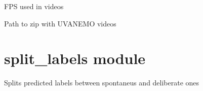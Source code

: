 \documentclass[letterpaper,10pt,english]{sphinxmanual}
\begin{document}
\begin{fulllineitems}
\begin{fulllineitems}
\begin{quote}
\begin{description}
\end{description}\end{quote}

\end{fulllineitems}


\begin{fulllineitems}
\label{\detokenize{net:net.UVANEMO.videos_frequency}}
\pysigstartsignatures
{}
\pysigstopsignatures
\sphinxAtStartPar
FPS used in videos

\end{fulllineitems}


\begin{fulllineitems}
\label{\detokenize{net:net.UVANEMO.videos_path}}
\pysigstartsignatures
{}
\pysigstopsignatures
\sphinxAtStartPar
Path to zip with UVA\sphinxhyphen{}NEMO videos

\end{fulllineitems}


\end{fulllineitems}


\sphinxstepscope


\section{split\_labels module}
\label{\detokenize{split_labels:module-split_labels}}\label{\detokenize{split_labels:split-labels-module}}\label{\detokenize{split_labels::doc}}

\begin{fulllineitems}
\label{\detokenize{split_labels:split_labels.main}}
\pysigstartsignatures
{}
\pysigstopsignatures
\sphinxAtStartPar
Splits predicted labels between spontaneus and deliberate ones

\end{fulllineitems}
\end{document}
